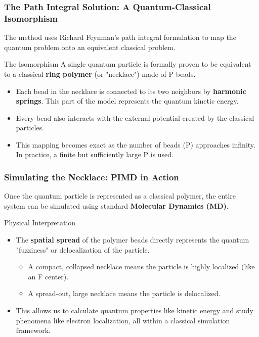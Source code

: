 \begin{frame}
  \frametitle{The Path Integral Solution: A Quantum-Classical Isomorphism}
  
  The method uses Richard Feynman's path integral formulation to map the quantum problem onto an equivalent classical problem. \pause
  
  \begin{block}{The Isomorphism}
    A single quantum particle is formally proven to be equivalent to a classical \textbf{ring polymer} (or "necklace") made of P beads.
  \end{block} \pause
  
  \begin{itemize}
    \item Each bead in the necklace is connected to its two neighbors by \textbf{harmonic springs}. This part of the model represents the quantum kinetic energy. \pause
    
    \item Every bead also interacts with the external potential created by the classical particles. \pause
    
    \item This mapping becomes exact as the number of beads (P) approaches infinity. In practice, a finite but sufficiently large P is used.
  \end{itemize}
\end{frame}

\begin{frame}
  \frametitle{Simulating the Necklace: PIMD in Action}
  
  Once the quantum particle is represented as a classical polymer, the entire system can be simulated using standard \textbf{Molecular Dynamics (MD)}. \pause
  
  \begin{alertblock}{Physical Interpretation}
    \begin{itemize}
      \item The \textbf{spatial spread} of the polymer beads directly represents the quantum "fuzziness" or delocalization of the particle. \pause
      \begin{itemize}
          \item A compact, collapsed necklace means the particle is highly localized (like an F center).
          \item A spread-out, large necklace means the particle is delocalized. \pause
      \end{itemize}
      \item This allows us to calculate quantum properties like kinetic energy and study phenomena like electron localization, all within a classical simulation framework.
    \end{itemize}
  \end{alertblock}
  
\end{frame}